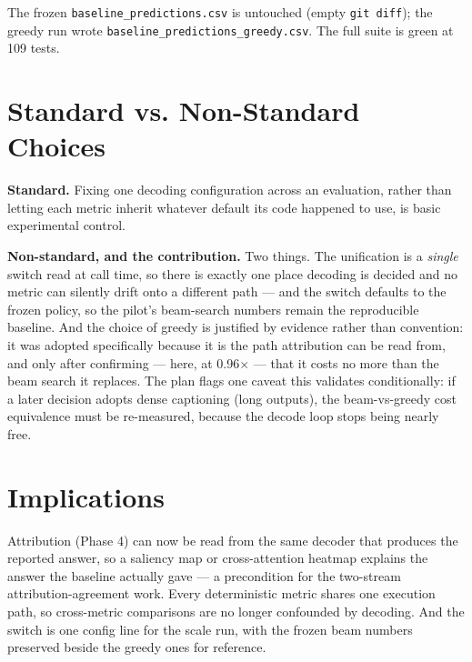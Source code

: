 The frozen \texttt{baseline\_predictions.csv} is untouched (empty \texttt{git diff}); the greedy run
wrote \texttt{baseline\_predictions\_greedy.csv}. The full suite is green at 109 tests.

\section{Standard vs. Non-Standard Choices}

\textbf{Standard.} Fixing one decoding configuration across an evaluation, rather than letting each
metric inherit whatever default its code happened to use, is basic experimental control.

\textbf{Non-standard, and the contribution.} Two things. The unification is a \emph{single} switch read
at call time, so there is exactly one place decoding is decided and no metric can silently drift onto a
different path --- and the switch defaults to the frozen policy, so the pilot's beam-search numbers
remain the reproducible baseline. And the choice of greedy is justified by evidence rather than
convention: it was adopted specifically because it is the path attribution can be read from, and only
after confirming --- here, at 0.96$\times$ --- that it costs no more than the beam search it replaces.
The plan flags one caveat this validates conditionally: if a later decision adopts dense captioning
(long outputs), the beam-vs-greedy cost equivalence must be re-measured, because the decode loop stops
being nearly free.

\section{Implications}

Attribution (Phase 4) can now be read from the same decoder that produces the reported answer, so a
saliency map or cross-attention heatmap explains the answer the baseline actually gave --- a
precondition for the two-stream attribution-agreement work. Every deterministic metric shares one
execution path, so cross-metric comparisons are no longer confounded by decoding. And the switch is one
config line for the scale run, with the frozen beam numbers preserved beside the greedy ones for
reference.
